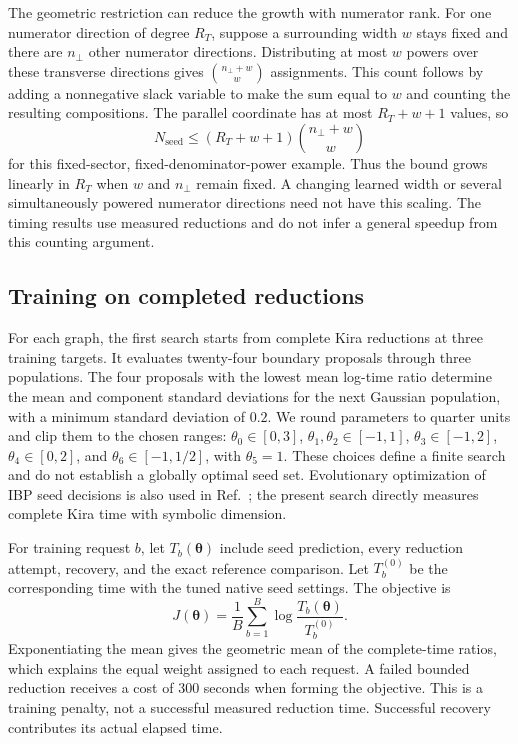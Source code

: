 The geometric restriction can reduce the growth with numerator rank. For one numerator direction of degree $R_T$, suppose a surrounding width $w$ stays fixed and there are $n_\perp$ other numerator directions. Distributing at most $w$ powers over these transverse directions gives $\binom{n_\perp+w}{w}$ assignments. This count follows by adding a nonnegative slack variable to make the sum equal to $w$ and counting the resulting compositions. The parallel coordinate has at most $R_T+w+1$ values, so
\begin{equation}
 N_{\mathrm{seed}}\leq
 (R_T+w+1)\binom{n_\perp+w}{w}
 \label{eq:geometry-count}
\end{equation}
for this fixed-sector, fixed-denominator-power example. Thus the bound grows linearly in $R_T$ when $w$ and $n_\perp$ remain fixed. A changing learned width or several simultaneously powered numerator directions need not have this scaling. The timing results use measured reductions and do not infer a general speedup from this counting argument.

\subsection{Training on completed reductions}
For each graph, the first search starts from complete Kira reductions at three training targets. It evaluates twenty-four boundary proposals through three populations. The four proposals with the lowest mean log-time ratio determine the mean and component standard deviations for the next Gaussian population, with a minimum standard deviation of $0.2$. We round parameters to quarter units and clip them to the chosen ranges: $\theta_0\in[0,3]$, $\theta_1,\theta_2\in[-1,1]$, $\theta_3\in[-1,2]$, $\theta_4\in[0,2]$, and $\theta_6\in[-1,1/2]$, with $\theta_5=1$. These choices define a finite search and do not establish a globally optimal seed set. Evolutionary optimization of IBP seed decisions is also used in Ref.~\cite{TubeSeeding2026}; the present search directly measures complete Kira time with symbolic dimension.

For training request $b$, let $T_b(\boldsymbol\theta)$ include seed prediction, every reduction attempt, recovery, and the exact reference comparison. Let $T_b^{(0)}$ be the corresponding time with the tuned native seed settings. The objective is
\begin{equation}
 J(\boldsymbol\theta)=\frac1B\sum_{b=1}^{B}
       \log\frac{T_b(\boldsymbol\theta)}{T_b^{(0)}}.
 \label{eq:geometry-objective}
\end{equation}
Exponentiating the mean gives the geometric mean of the complete-time ratios, which explains the equal weight assigned to each request. A failed bounded reduction receives a cost of 300 seconds when forming the objective. This is a training penalty, not a successful measured reduction time. Successful recovery contributes its actual elapsed time.

